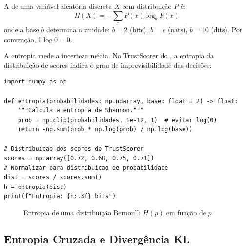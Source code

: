 \begin{definicao}[Entropia]
    A  de uma variável aleatória discreta $X$ com
    distribuição $P$ é:
    \[
    H(X) = -\sum_{x} P(x) \log_b P(x)
    \]
    onde a base $b$ determina a unidade: $b = 2$ (bits), $b = e$ (nats),
    $b = 10$ (dits). Por convenção, $0 \log 0 = 0$.
\end{definicao}

\begin{exemplo}
    A entropia mede a incerteza média. No TrustScorer do \opencodeeco{}, a
    entropia da distribuição de scores indica o grau de imprevisibilidade
    das decisões:
    \begin{lstlisting}[style=pythonstyle]
import numpy as np

def entropia(probabilidades: np.ndarray, base: float = 2) -> float:
    """Calcula a entropia de Shannon."""
    prob = np.clip(probabilidades, 1e-12, 1)  # evitar log(0)
    return -np.sum(prob * np.log(prob) / np.log(base))

# Distribuicao dos scores do TrustScorer
scores = np.array([0.72, 0.68, 0.75, 0.71])
# Normalizar para distribuicao de probabilidade
dist = scores / scores.sum()
h = entropia(dist)
print(f"Entropia: {h:.3f} bits")
    \end{lstlisting}
\end{exemplo}

\begin{figure}[htb]
    \centering
    \caption{Entropia de uma distribuição Bernoulli $H(p)$ em função de $p$}
    \label{fig:entropia-bernoulli}
\end{figure}

\subsection{Entropia Cruzada e Divergência KL}


